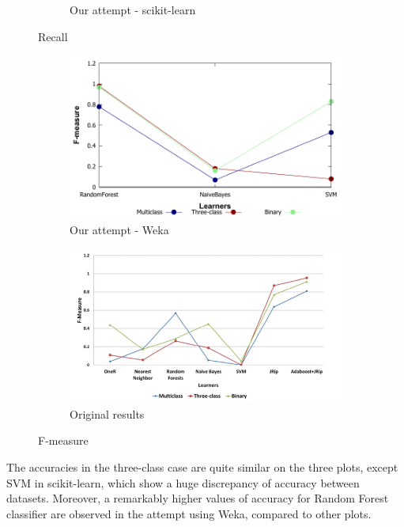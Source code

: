\begin{figure}[H]
\begin{subfigure}[t]{0.4\textwidth}
        \caption{Our attempt - scikit-learn}
    \end{subfigure}
    \caption{Recall}
    \label{fig:recall}
\end{figure}

\begin{figure}[H]
    \centering
    \begin{subfigure}[t]{0.5\textwidth}
        \includegraphics[width=\linewidth]{images/weka_f1}
        \caption{Our attempt - Weka}
    \end{subfigure}%
    \begin{subfigure}[t]{0.5\textwidth}
        \includegraphics[width=\linewidth]{images/weka_f1_cite.png}
        \caption{Original results \cite{borges_hink_machine_2014-1}}
    \end{subfigure}
    \caption{F-measure}
    \label{fig:f1}
\end{figure}

The accuracies in the three-class case are quite similar on the three plots, except SVM in scikit-learn, which show a huge discrepancy of accuracy between datasets. Moreover, a remarkably higher values of accuracy for Random Forest classifier are observed in the attempt using Weka, compared to other plots.

